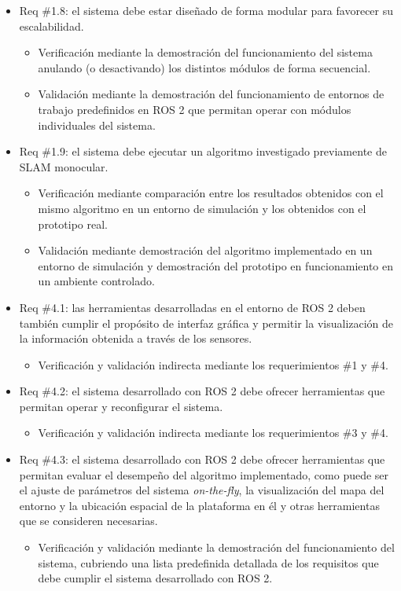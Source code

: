 \documentclass[
11pt, %
codirector, %
]{charter}
\begin{document}
\begin{itemize}
\begin{itemize}
	\end{itemize}
	\item Req \#1.8: el sistema debe estar diseñado de forma modular para favorecer su escalabilidad.
	\begin{itemize}
		\item Verificación mediante la demostración del funcionamiento del sistema anulando (o desactivando) los distintos módulos de forma secuencial.
		\item Validación mediante la demostración del funcionamiento de entornos de trabajo predefinidos en ROS 2 que permitan operar con módulos individuales del sistema. 
	\end{itemize}
	\item Req \#1.9: el sistema debe ejecutar un algoritmo investigado previamente de SLAM monocular.
	\begin{itemize}
		\item Verificación mediante comparación entre los resultados obtenidos con el mismo algoritmo en un entorno de simulación y los obtenidos con el prototipo real.
		\item Validación mediante demostración del algoritmo implementado en un entorno de simulación y demostración del prototipo en funcionamiento en un ambiente controlado.
	\end{itemize}
	\item Req \#4.1: las herramientas desarrolladas en el entorno de ROS 2 deben también cumplir el propósito de interfaz gráfica y permitir la visualización de la información obtenida a través de los sensores.
	\begin{itemize}
		\item Verificación y validación indirecta mediante los requerimientos \#1 y \#4.
	\end{itemize}
	\item Req \#4.2: el sistema desarrollado con ROS 2 debe ofrecer herramientas que permitan operar y reconfigurar el sistema.
	\begin{itemize}
		\item Verificación y validación indirecta mediante los requerimientos \#3 y \#4.
	\end{itemize}
	\item Req \#4.3: el sistema desarrollado con ROS 2 debe ofrecer herramientas que permitan evaluar el desempeño del algoritmo implementado, como puede ser el ajuste de parámetros del sistema \textit{on-the-fly}, la visualización del mapa del entorno y la ubicación espacial de la plataforma en él y otras herramientas que se consideren necesarias.
	\begin{itemize}
		\item Verificación y validación mediante la demostración del funcionamiento del sistema, cubriendo una lista predefinida detallada de los requisitos que debe cumplir el sistema desarrollado con ROS 2.
	\end{itemize}
\end{itemize}
\end{document}
